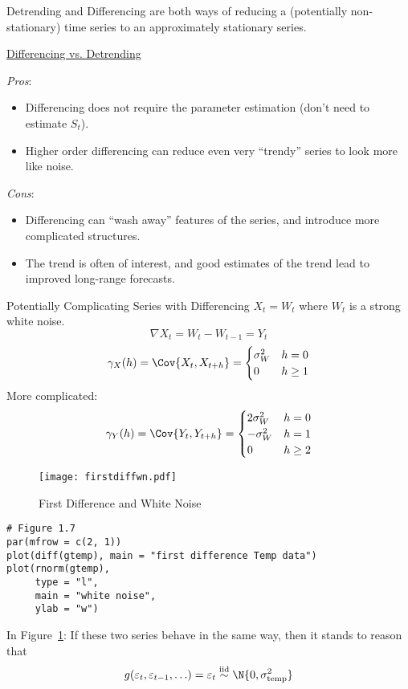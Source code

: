 Detrending and Differencing are both ways of reducing a
(potentially non-stationary) time series
to an approximately stationary series.

\underline{Differencing vs. Detrending}

\emph{Pros}:
\begin{itemize}
    \item Differencing does not require the parameter estimation
          (don't need to estimate $ S_t $).
    \item Higher order differencing can reduce even very
          ``trendy'' series to look more like noise.
\end{itemize}
\emph{Cons}:
\begin{itemize}
    \item Differencing can ``wash away'' features of the series,
          and introduce more complicated structures.
    \item The trend is often of interest, and good estimates
          of the trend lead to improved long-range forecasts.
\end{itemize}
\begin{Example}{Potentially Complicating Series with Differencing}{}
    $ X_t=W_t $ where $ W_t $ is a strong white noise.
    \[ \nabla X_t=W_t-W_{t-1}=Y_t \]
    \[ \gamma_X(h)=\Cov{X_t,X_{t+h}}=\begin{cases}
            \sigma_W^2 & h=0    \\
            0          & h\ge 1
        \end{cases} \]
    More complicated:
    \[ \gamma_Y(h)=\Cov{Y_t,Y_{t+h}}=\begin{cases}
            2\sigma_W^2 & h=0    \\
            -\sigma_W^2 & h=1    \\
            0           & h\ge 2
        \end{cases} \]
\end{Example}
\begin{figure}[!ht]
    \centering
    \texttt{[image: firstdiffwn.pdf]}
    \caption{First Difference and White Noise}\label{fig:firstdiffwn}
\end{figure}
\begin{verbatim}
# Figure 1.7
par(mfrow = c(2, 1))
plot(diff(gtemp), main = "first difference Temp data")
plot(rnorm(gtemp),
     type = "l",
     main = "white noise",
     ylab = "w")    
\end{verbatim}
In Figure~\ref{fig:firstdiffwn}: If these two series behave in
the same way, then it stands to reason that
\[ g(\varepsilon_t,\varepsilon_{t-1},\ldots)=\varepsilon_t
    \stackrel{\text{iid}}{\sim}\N{0,\sigma^2_{\text{temp}}} \]
